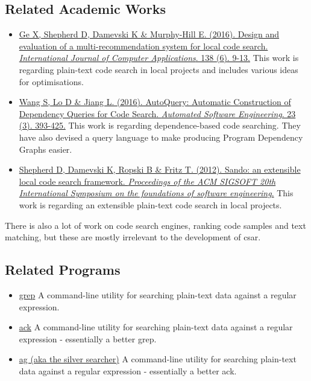 \documentclass[12pt, letterpaper]{article}
\begin{document}
\subsection{Related Academic Works}
\begin{itemize}
  \item \href{http://www.sciencedirect.com.ezproxy.library.qmul.ac.uk/science/article/pii/S1045926X16300970?_rdoc=1&_fmt=high&_origin=gateway&_docanchor=&md5=b8429449ccfc9c30159a5f9aeaa92ffb&ccp=y}{Ge X, Shepherd D, Damevski K \& Murphy-Hill E. (2016). Design and evaluation of a multi-recommendation system for local code search. \textit{International Journal of Computer Applications}. 138 (6). 9-13.}\newline
  This work is regarding plain-text code search in local projects and includes various ideas for optimisations.
  \item \href{https://link-springer-com.ezproxy.library.qmul.ac.uk/article/10.1007%2Fs10515-014-0170-2}{Wang S, Lo D \& Jiang L. (2016). AutoQuery: Automatic Construction of Dependency Queries for Code Search. \textit{Automated Software Engineering}. 23 (3). 393-425.}\newline
  This work is regarding dependence-based code searching.
  They have also devised a query language to make producing Program Dependency Graphs easier.
  \item \href{http://dl.acm.org.ezproxy.library.qmul.ac.uk/citation.cfm?id=2393612}{Shepherd D, Damevski K, Ropski B \& Fritz T. (2012). Sando: an extensible local code search framework. \textit{Proceedings of the ACM SIGSOFT 20th International Symposium on the foundations of software engineering}.}\newline
  This work is regarding an extensible plain-text code search in local projects.
\end{itemize}

There is also a lot of work on code search engines, ranking code samples and text matching, but these are mostly irrelevant to the development of csar.

\subsection{Related Programs}
\begin{itemize}
  \item \href{https://en.wikipedia.org/wiki/Grep}{grep}\newline
  A command-line utility for searching plain-text data against a regular expression.
  \item \href{https://beyondgrep.com/}{ack}\newline
  A command-line utility for searching plain-text data against a regular expression - essentially a better grep.
  \item \href{https://github.com/ggreer/the_silver_searcher}{ag (aka the silver searcher)}\newline
  A command-line utility for searching plain-text data against a regular expression - essentially a better ack.
\end{itemize}
\end{document}
